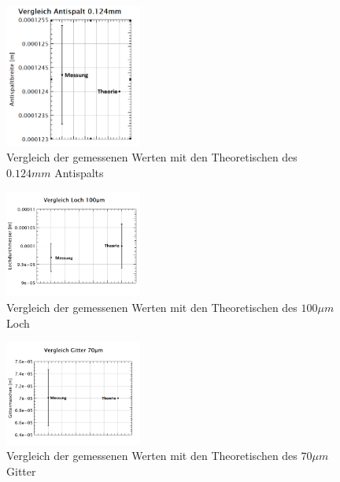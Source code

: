 \begin{figure}[H]
	\centering
	\includegraphics[width=0.4\textwidth]{data/dis_asp_12.png}
	\caption{Vergleich der gemessenen Werten mit den Theoretischen des $0.124mm$ Antispalts}
	\label{fig:dis_aspalt_12}
\end{figure}
\begin{figure}[H]
	\centering
	\includegraphics[width=0.4\textwidth]{data/dis_loch_100.png}
	\caption{Vergleich der gemessenen Werten mit den Theoretischen des $100\mu m$ Loch}
	\label{fig:dis_loch_100}
\end{figure}
\begin{figure}[H]
	\centering
	\includegraphics[width=0.4\textwidth]{data/dis_gitter.png}
	\caption{Vergleich der gemessenen Werten mit den Theoretischen des $70\mu m$ Gitter}
	\label{fig:dis_gitter}
\end{figure}

\newpage
